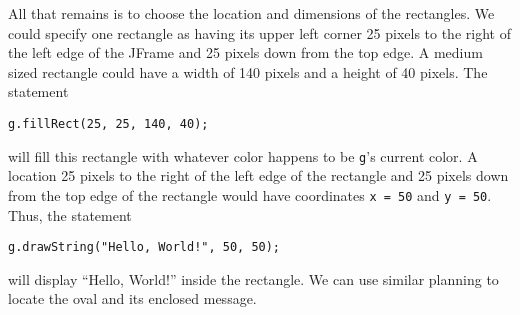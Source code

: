 All that remains is to choose the location and dimensions of the
rectangles.  We could specify one rectangle as having its upper left
corner 25 pixels to the right of the left edge of the JFrame
and 25 pixels down from the top edge.  A medium sized rectangle could
have a width of 140 pixels and a height of 40 pixels.  The statement
\begin{jjjlisting}
\begin{lstlisting}
g.fillRect(25, 25, 140, 40);
\end{lstlisting}
\end{jjjlisting}

\noindent will fill this rectangle with whatever color happens to
be {\tt g}'s current color.  A location 25 pixels to the right of the
left edge of the rectangle and 25 pixels down from the top 
edge of the rectangle would have coordinates \mbox{\tt x = 50} and
\mbox{\tt y = 50}.  Thus, the statement

\begin{jjjlisting}
\begin{lstlisting}
g.drawString("Hello, World!", 50, 50);
\end{lstlisting}
\end{jjjlisting}

\noindent will display ``Hello, World!'' inside the rectangle. We can
use similar planning to locate the oval and its enclosed message.

